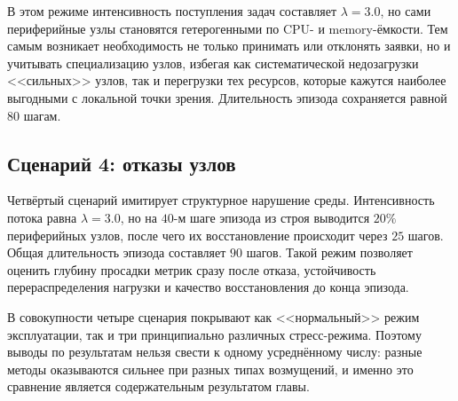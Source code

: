 В этом режиме интенсивность поступления задач составляет $\lambda = 3.0$,
но сами периферийные узлы становятся гетерогенными по CPU- и
memory-ёмкости. Тем самым возникает необходимость не только принимать или
отклонять заявки, но и учитывать специализацию узлов, избегая как
систематической недозагрузки <<сильных>> узлов, так и перегрузки тех
ресурсов, которые кажутся наиболее выгодными с локальной точки зрения.
Длительность эпизода сохраняется равной $80$ шагам.

\subsection{Сценарий 4: отказы узлов}

Четвёртый сценарий имитирует структурное нарушение среды. Интенсивность
потока равна $\lambda = 3.0$, но на $40$-м шаге эпизода из строя выводится
$20\%$ периферийных узлов, после чего их восстановление происходит через
$25$ шагов. Общая длительность эпизода составляет $90$ шагов. Такой режим
позволяет оценить глубину просадки метрик сразу после отказа, устойчивость
перераспределения нагрузки и качество восстановления до конца эпизода.

В совокупности четыре сценария покрывают как <<нормальный>> режим
эксплуатации, так и три принципиально различных стресс-режима. Поэтому
выводы по результатам нельзя свести к одному усреднённому числу: разные
методы оказываются сильнее при разных типах возмущений, и именно это
сравнение является содержательным результатом главы.
